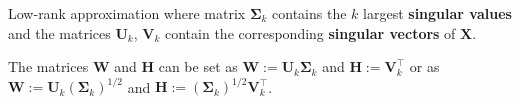 \documentclass[11pt,compress,t,notes=noshow, xcolor=table]{beamer}
\begin{document}
\begin{vbframe}{Low-rank approximation}
where matrix $\boldsymbol{\Sigma}_k$ contains the $k$ largest \textbf{singular values} and the matrices $\mathbf{U}_k$, $\mathbf{V}_k$ contain the corresponding \textbf{singular vectors} of $\mathbf{X}$. 

\lz 

The matrices $\bm{W}$ and $\bm{H}$ can be set as $\bm{W}:= \mathbf{U}_k \boldsymbol{\Sigma}_k$ and $\bm{H}:= \mathbf{V}_k^\top$ or as $\bm{W}:= \mathbf{U}_k (\boldsymbol{\Sigma}_k)^{1 / 2}$ and $\bm{H}:= (\boldsymbol{\Sigma}_k)^{1 / 2}\mathbf{V}_k^\top$. 

\end{vbframe}



\endlecture
\end{document}
